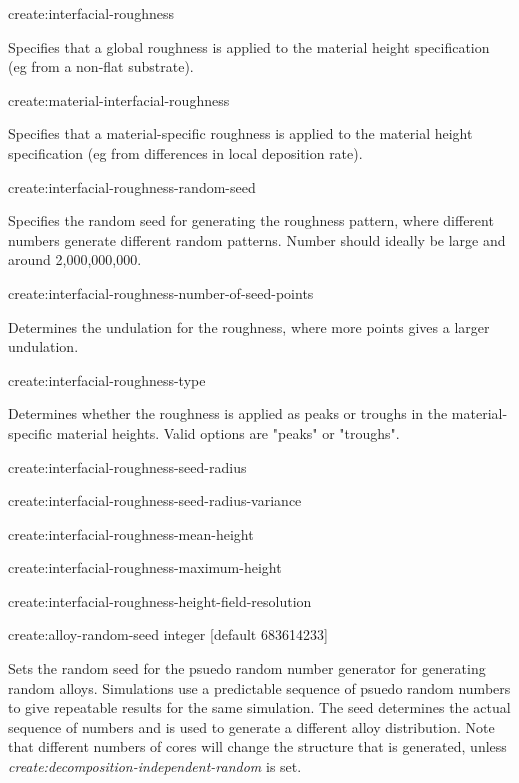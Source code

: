 {\zicf create:interfacial-roughness} Specifies that a global roughness is applied to the material height specification (eg from a non-flat substrate).

{\zicf create:material-interfacial-roughness} Specifies that a material-specific roughness is applied to the material height specification (eg from differences in local deposition rate).

{\zicf create:interfacial-roughness-random-seed} Specifies the random seed for generating the roughness pattern, where different numbers generate different random patterns. Number should ideally be large and around 2,000,000,000.

{\zicf create:interfacial-roughness-number-of-seed-points} Determines the undulation for the roughness, where more points gives a larger undulation.

{\zicf create:interfacial-roughness-type} Determines whether the roughness is applied as peaks or troughs in the material-specific material heights. Valid options are "peaks" or "troughs".

{\zicf create:interfacial-roughness-seed-radius}

{\zicf create:interfacial-roughness-seed-radius-variance}

{\zicf create:interfacial-roughness-mean-height}

{\zicf create:interfacial-roughness-maximum-height}

{\zicf create:interfacial-roughness-height-field-resolution}

{\zicf create:alloy-random-seed integer [default 683614233]} Sets the random seed for the psuedo random number generator for generating random alloys. Simulations use a predictable sequence of psuedo random numbers to give repeatable results for the same simulation. The seed determines the actual sequence of numbers and is used to generate a different alloy distribution. Note that different numbers of cores will change the structure that is generated, unless \textit{create:decomposition-independent-random} is set.

